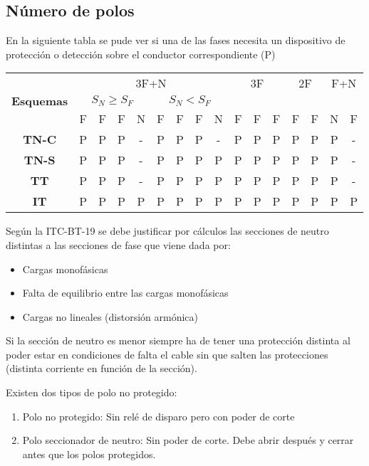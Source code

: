 \subsection{Número de polos}
En la siguiente tabla se pude ver si una de las fases necesita un dispositivo de protección o detección sobre el conductor correspondiente (P)
\begin{table}[H]
	\centering
	\begin{tabular}{|c|c|c|c|c|c|c|c|c|c|c|c|c|c|c|c|}
		\hline
		\multirow{3}{*}{\textbf{Esquemas}} &	\multicolumn{8}{c|}{3F+N}& \multicolumn{3}{c|}{3F} & \multicolumn{2}{c|}{2F}& \multicolumn{2}{c|}{F+N}\\ \cline{2-9} 
		 & \multicolumn{4}{c|}{$S_N\ge S_F$}& \multicolumn{4}{c|}{$S_N<S_F$}&\multicolumn{3}{c|}{} & \multicolumn{2}{c|}{}& \multicolumn{2}{c|}{}\\ \cline{2-16} 
		& F & F & F & N & F & F & F & N & F & F & F  & F & F & N & F \\ \hline
		\textbf{TN-C} & P & P &P  & - & P & P & P & -  & P & P & P & P & P  & P & - \\ \hline
		\textbf{TN-S} & P & P &P  & - & P & P & P & P  & P & P & P & P & P  & P &- \\ \hline
		\textbf{TT}   & P & P &P  & - & P & P & P & P  & P & P & P & P & P  & P &- \\ \hline
		\textbf{IT}   & P & P & P & P & P & P & P & P  & P & P & P & P & P  & P &P \\ \hline
	\end{tabular}
\end{table}

Según la ITC-BT-19 se debe justificar por cálculos las secciones de neutro distintas a las secciones de fase que viene dada por:
\begin{itemize}
	\item Cargas monofásicas
	\item Falta de equilibrio entre las cargas monofásicas
	\item Cargas no lineales (distorsión armónica)
\end{itemize}

Si la sección de neutro es menor siempre ha de tener una protección distinta al poder estar en condiciones de falta el cable sin que salten las protecciones (distinta corriente en función de la sección).
\newline

Existen dos tipos de polo no protegido:
\begin{enumerate}
	\item Polo no protegido: Sin relé de disparo pero con poder de corte
	\item Polo seccionador de neutro: Sin poder de corte. Debe abrir después y cerrar antes que los polos protegidos.
\end{enumerate}
